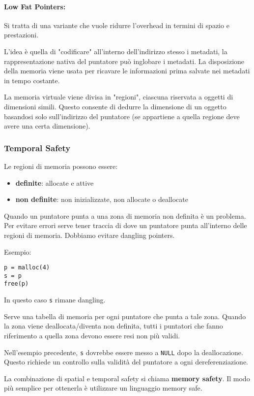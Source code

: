 \paragraph{Low Fat Pointers:} Si tratta di una variante che vuole ridurre l'overhead in termini di spazio e prestazioni. 

L'idea è quella di "codificare" all'interno dell'indirizzo stesso i metadati, la rappresentazione nativa del puntatore può inglobare i metadati. La disposizione della memoria viene usata per ricavare le informazioni prima salvate nei metadati in tempo costante.

La memoria virtuale viene divisa in "regioni", ciascuna riservata a oggetti di dimensioni simili. Questo consente di dedurre la dimensione di un oggetto basandosi solo sull'indirizzo del puntatore (se appartiene a quella regione deve avere una certa dimensione).

\subsubsection{Temporal Safety}

Le regioni di memoria possono essere: 
\begin{itemize}
	\item \textbf{definite}: allocate e attive
    
	\item \textbf{non definite}: non inizializzate, non allocate o deallocate
\end{itemize}

Quando un puntatore punta a una zona di memoria non definita è un problema. Per evitare errori serve tener traccia di dove un puntatore punta all'interno delle regioni di memoria. Dobbiamo evitare dangling pointers.

Esempio: 
\begin{verbatim}
p = malloc(4)
s = p
free(p)
\end{verbatim}
In questo caso \texttt{s} rimane dangling.

Serve una tabella di memoria per ogni puntatore che punta a tale zona. Quando la zona viene deallocata/diventa non definita, tutti i puntatori che fanno riferimento a quella zona devono essere resi non più validi. 

Nell'esempio precedente, \texttt{s} dovrebbe essere messo a \texttt{NULL} dopo la deallocazione. Questo richiede un controllo sulla validità del puntatore a ogni dereferenziazione.

La combinazione di spatial e temporal safety si chiama \textbf{memory safety}. Il modo più semplice per ottenerla è utilizzare un linguaggio memory safe. 

